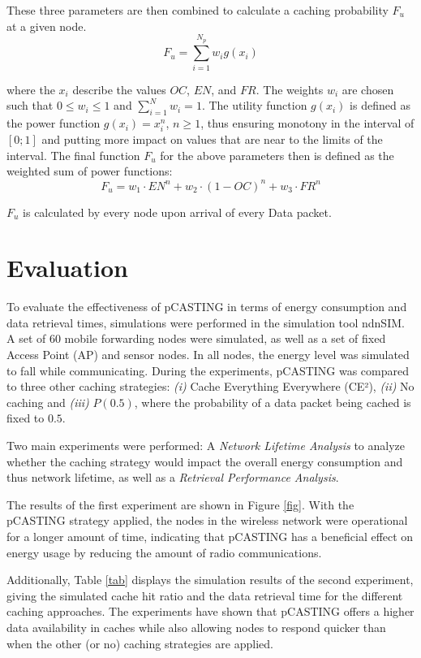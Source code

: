 \documentclass[conference]{IEEEtran}
\begin{document}
These three parameters are then combined to calculate a caching probability $F_u$ at a given node.
\begin{equation}
	F_u = \sum_{i = 1}^{N_p} w_i g(x_i)
\end{equation}

where the $x_i$ describe the values $OC$, $EN$, and $FR$. The weights $w_i$ are chosen such that $0 \leq w_i \leq 1$ and $\sum_{i = 1}^{N} w_i = 1$. The utility function $g(x_i)$ is defined as the power function $g(x_i) = x_i^n$, $n \geq 1$, thus ensuring monotony in the interval of $[0; 1]$ and putting more impact on values that are near to the limits of the interval. The final function $F_u$ for the above parameters then is defined as the weighted sum of power functions:
\begin{equation}
	F_u = w_1 \cdot EN^n + w_2 \cdot (1 - OC)^n + w_3 \cdot FR^n
\end{equation}

$F_u$ is calculated by every node upon arrival of every Data packet.

\section{Evaluation}
\label{sec:eval}

To evaluate the effectiveness of {pCASTING} in terms of energy consumption and data retrieval times, simulations were performed in the simulation tool {ndnSIM}. A set of 60 mobile forwarding nodes were simulated, as well as a set of fixed Access Point (AP) and sensor nodes. In all nodes, the energy level was simulated to fall while communicating. During the experiments, {pCASTING} was compared to three other caching strategies: \textit{(i)} Cache Everything Everywhere (CE²), \textit{(ii)} No caching and \textit{(iii)} $P(0.5)$, where the probability of a data packet being cached is fixed to $0.5$.

Two main experiments were performed: A \textit{Network Lifetime Analysis} to analyze whether the caching strategy would impact the overall energy consumption and thus network lifetime, as well as a \textit{Retrieval Performance Analysis}.

The results of the first experiment are shown in Figure \ref{fig}. With the {pCASTING} strategy applied, the nodes in the wireless network were operational for a longer amount of time, indicating that {pCASTING} has a beneficial effect on energy usage by reducing the amount of radio communications.

Additionally, Table \ref{tab} displays the simulation results of the second experiment, giving the simulated cache hit ratio and the data retrieval time for the different caching approaches. The experiments have shown that {pCASTING} offers a higher data availability in caches while also allowing nodes to respond quicker than when the other (or no) caching strategies are applied.
\end{document}
